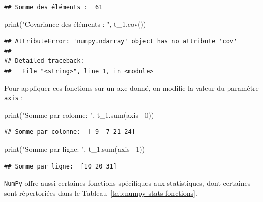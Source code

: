 \documentclass[12pt,]{book}
\newenvironment{Shaded}{\begin{snugshade}}{\end{snugshade}}
\newcommand{\DecValTok}[1]{\textcolor[rgb]{0.00,0.00,0.81}{#1}}
\newcommand{\StringTok}[1]{\textcolor[rgb]{0.31,0.60,0.02}{#1}}
\newcommand{\OperatorTok}[1]{\textcolor[rgb]{0.81,0.36,0.00}{\textbf{#1}}}
\newcommand{\BuiltInTok}[1]{#1}
\newcommand{\NormalTok}[1]{#1}
\numberwithin{equation}{section}
\numberwithin{countremarque}{section}
\begin{document}
\begin{lstlisting}
## Somme des éléments :  61
\end{lstlisting}

\begin{Shaded}
\begin{Highlighting}[]
\BuiltInTok{print}\NormalTok{(}\StringTok{"Covariance des éléments : "}\NormalTok{, t_1.cov())}
\end{Highlighting}
\end{Shaded}

\begin{lstlisting}
## AttributeError: 'numpy.ndarray' object has no attribute 'cov'
## 
## Detailed traceback: 
##   File "<string>", line 1, in <module>
\end{lstlisting}

Pour appliquer ces fonctions sur un axe donné, on modifie la valeur du
paramètre \texttt{axis} :

\begin{Shaded}
\begin{Highlighting}[]
\BuiltInTok{print}\NormalTok{(}\StringTok{"Somme par colonne: "}\NormalTok{, t_1.}\BuiltInTok{sum}\NormalTok{(axis}\OperatorTok{=}\DecValTok{0}\NormalTok{))}
\end{Highlighting}
\end{Shaded}

\begin{lstlisting}
## Somme par colonne:  [ 9  7 21 24]
\end{lstlisting}

\begin{Shaded}
\begin{Highlighting}[]
\BuiltInTok{print}\NormalTok{(}\StringTok{"Somme par ligne: "}\NormalTok{, t_1.}\BuiltInTok{sum}\NormalTok{(axis}\OperatorTok{=}\DecValTok{1}\NormalTok{))}
\end{Highlighting}
\end{Shaded}

\begin{lstlisting}
## Somme par ligne:  [10 20 31]
\end{lstlisting}

\texttt{NumPy} offre aussi certaines fonctions spécifiques aux
statistiques, dont certaines sont répertoriées dans le
Tableau~\ref{tab:numpy-stats-fonctions}.
\end{document}
